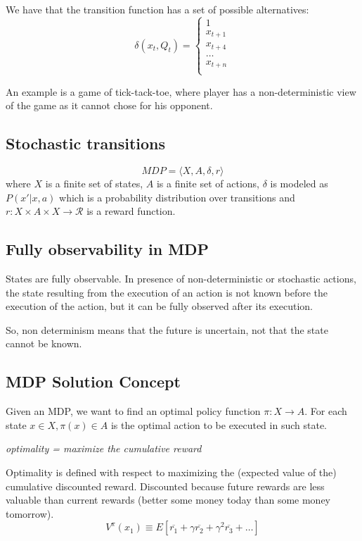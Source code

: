 We have that the transition function has a set of possible alternatives:
\begin{equation*}
    \delta(x_{t}, Q_{t}) = \begin{cases}
        1\\
        x_{t+1}\\
        x_{t+4}\\
        \dots\\
        x_{t+n}\\
    \end{cases}
\end{equation*}

An example is a game of tick-tack-toe, where player has a non-deterministic view of the game as it cannot chose for his opponent.

\subsection{Stochastic transitions}
\begin{equation}
    MDP = \langle X, A, \delta, r\rangle
\end{equation}
where $X$ is a finite set of states, $A$ is a finite set of actions, $\delta$ is modeled as $P(x'|x, a)$ which is a probability distribution over transitions and $r : X \times A \times X \xrightarrow{} \mathcal{R}$ is a reward function.

\subsection{Fully observability in MDP}
States are fully observable. In presence of non-deterministic or stochastic actions, the state resulting from the execution of an action is not known before the execution of the action, but it can be fully observed after its execution.

So, non determinism means that the future is uncertain, not that the state cannot be known.

\subsection{MDP Solution Concept}
Given an MDP, we want to find an optimal policy function $\pi : X \xrightarrow{} A$. For each state $x \in X, \pi (x) \in A$ is the optimal action to be executed in such state.

\textit{optimality = maximize the cumulative reward}

Optimality is defined with respect to maximizing the (expected value of the) cumulative discounted reward. Discounted because future rewards are less valuable than current rewards (better some money today than some money tomorrow). 
\begin{equation}
    V^{\pi}(x_{1}) \equiv E[\overline{r_{1}} + \gamma\overline{r_{2}} + \gamma^{2}\overline{r_{3}} + \dots ]
\end{equation}

